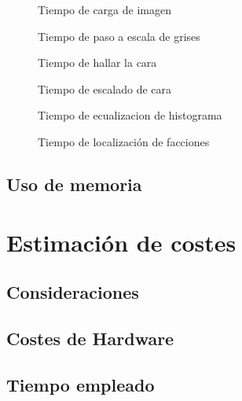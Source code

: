 \begin{figure}[h!]
        \centering
        
        \caption{Tiempo de carga de imagen}
        \label{fig:tiempo_carga_imagen}
\end{figure}

\begin{figure}[h!]
        \centering
        
        \caption{Tiempo de paso a escala de grises}
        \label{fig:tiempo_grises}
\end{figure}
\newpage

\begin{figure}[h!]
        \centering
        
        \caption{Tiempo de hallar la cara}
        \label{fig:tiempo_loc_cara}
\end{figure}

\begin{figure}[h!]
        \centering
        
        \caption{Tiempo de escalado de cara}
        \label{fig:tiempo_carga_imagen}
\end{figure}
\newpage

\begin{figure}[h!]
        \centering
        
        \caption{Tiempo de ecualizacion de histograma}
        \label{fig:tiempo_carga_imagen}
\end{figure}

\begin{figure}[h!]
        \centering
        
        \caption{Tiempo de localización de facciones}
        \label{fig:tiempo_facciones}
\end{figure}


\subsection{Uso de memoria}

\newpage

\section{Estimación de costes}
\subsection{Consideraciones}
\subsection{Costes de Hardware}
\subsection{Tiempo empleado}
